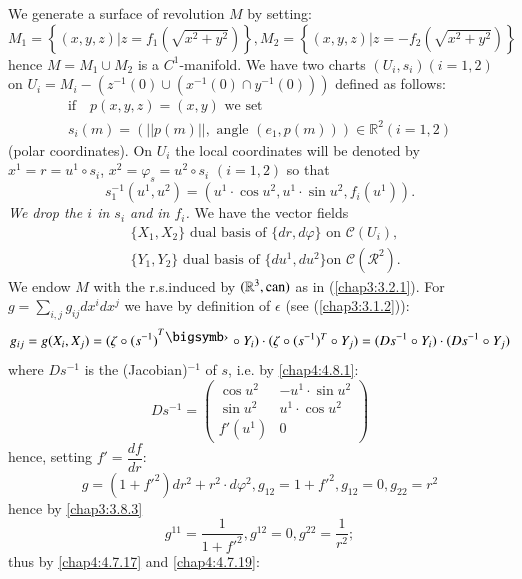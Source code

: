 We generate a surface of revolution $M$ by setting:
$$
M_{1}=\left\{(x,y,z)|z=f_{1}(\sqrt{x^{2}+y^{2}})\right\},
M_{2}=\left\{(x,y,z)|z=-f_{2}(\sqrt{x^{2}+y^{2}})\right\} 
$$
hence $M=M_{1}\cup M_{2}$ is a $C^{1}$-manifold. We have two charts
$(U_{i},s_{i})(i=1,2)$ on $U_{i}=M_{i}-(z^{-1}(0)\cup (x^{-1}(0)\cap
y^{-1}(0)))$ defined as follows:
\begin{gather*}
\text{if}\quad p(x,y,z)=(x,y)\text{ \ we set}\\
s_{i}(m)=(||p(m)||,\text{ angle } (e_{1},p(m)))\in\mathbb{R}^{2}(i=1,2)
\end{gather*}
(polar coordinates). On $U_{i}$ the local coordinates will be denoted
by $x^{1}=r=u^{1}\circ s_{i}$, $x^{2}=\varphi_{s}=u^{2}\circ s_{i}$
$(i=1,2)$ so that
\begin{equation*}
s^{-1}_{1}(u^{1},u^{2})=(u^{1}\cdot \cos u^{2}, u^{1}\cdot \sin u^{2},
f_{i}(u^{1})).\tag{4.8.1}\label{chap4:4.8.1} 
\end{equation*}
{\em We drop the $i$ in $s_{i}$ and in $f_{i}$.} We have the vector
fields 
\begin{align*}
& \{X_{1},X_{2}\} \text{ \ dual basis of \ } \{dr,d\varphi\}\text{ \  on
  \ } \mathscr{C}(U_{i}),\\
&\{Y_{1},Y_{2}\}\text{ \ dual basis of \ } \{du^{1},du^{2}\} \text{
  \ on \ } \mathscr{C}(\mathscr{R}^{2}).
\end{align*}
We endow $M$ with the r.s.\@ induced by $(\mathbb{R}^{3},\operatorname{can})$ as in
(\ref{chap3:3.2.1}). For $g=\sum\limits_{i,j}g_{ij}dx^{i}dx^{j}$ we have
by definition of $\epsilon$ (see (\ref{chap3:3.1.2})): 
$$
g_{ij}=g(X_{i},X_{j})=(\zeta\circ (s^{-1})^{T_{\bigdot}}\circ
Y_{i})\cdot (\zeta\circ(s^{-1})^{T}\circ Y_{j})=(Ds^{-1}\circ
Y_{i})\cdot (Ds^{-1}\circ Y_{j})
$$
where $Ds^{-1}$ is the (Jacobian)$^{-1}$ of $s$, i.e. by \eqref{chap4:4.8.1}:
$$
Ds^{-1}=
\begin{pmatrix}
\cos u^{2} & -u^{1}\cdot \sin u^{2}\\
\sin u^{2} & u^{1}\cdot \cos u^{2}\\
f'(u^{1}) & 0
\end{pmatrix}
$$\pageoriginale
hence, setting $f'=\dfrac{df}{dr}$:
\begin{equation*}
g=(1+{f'}^{2})dr^{2}+r^{2}\cdot d\varphi^{2},
g_{12}=1+{f'}^{2},g_{12}=0, g_{22}=r^{2}\tag{4.8.2}\label{chap4:4.8.2}
\end{equation*}
hence by \eqref{chap3:3.8.3}
$$
g^{11}=\dfrac{1}{1+{f'}^{2}}, g^{12}=0, g^{22}=\dfrac{1}{r^{2}};
$$
thus by \eqref{chap4:4.7.17} and \eqref{chap4:4.7.19}:
